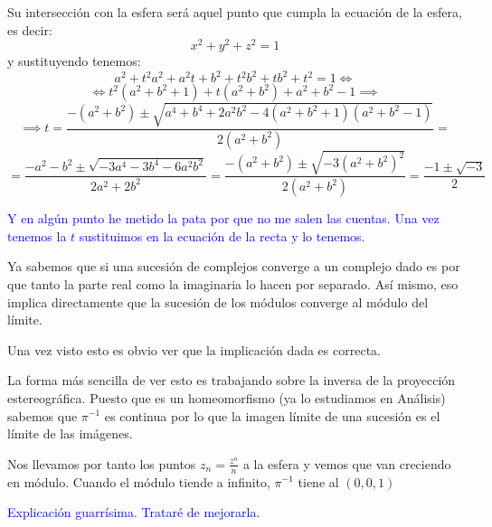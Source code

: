 \begin{problem}[1]
Su intersección con la esfera será aquel punto que cumpla la ecuación de la esfera, es decir:
\[x^2+y^2+z^2=1\]
y sustituyendo tenemos:
\[a^2+t^2a^2+a^2t + b^2+t^2b^2+tb^2+t^2 = 1 \iff\]
\[\iff t^2(a^2+b^2+1)+t(a^2+b^2)+a^2+b^2 -1 \implies \]
\[\implies t = \frac{-(a^2+b^2)\pm \sqrt{a^4+b^4 + 2a^2b^2-4(a^2+b^2+1)(a^2+b^2-1)}}{2(a^2+b^2)}=\]
\[=\frac{-a^2-b^2 \pm \sqrt{-3a^4-3b^4-6a^2b^2}}{2a^2+2b^2} = \frac{-(a^2+b^2) \pm \sqrt{-3(a^2+b^2)^2}}{2(a^2+b^2)} = \frac{-1\pm \sqrt{-3}}{2}\]

\textcolor{blue}{Y en algún punto he metido la pata por que no me salen las cuentas. Una vez tenemos la $t$ sustituimos en la ecuación de la recta y lo tenemos.}

\spart

Ya sabemos que si una sucesión de complejos converge a un complejo dado es por que tanto la parte real como la imaginaria lo hacen por separado. Así mismo, eso implica directamente que la sucesión de los módulos converge al módulo del límite.

Una vez visto esto es obvio ver que la implicación dada es correcta.

\spart

La forma más sencilla de ver esto es trabajando sobre la inversa de la proyección estereográfica. Puesto que es un homeomorfismo (ya lo estudiamos en Análisis) sabemos que $π^{-1}$ es continua por lo que la imagen límite de una sucesión es el límite de las imágenes.

Nos llevamos por tanto los puntos $z_n=\frac{z^n}{n}$ a la esfera y vemos que van creciendo en módulo. Cuando el módulo tiende a infinito, $π^{-1}$ tiene al $(0,0,1)$

\textcolor{blue}{Explicación guarrísima. Trataré de mejorarla.}

\end{problem}

